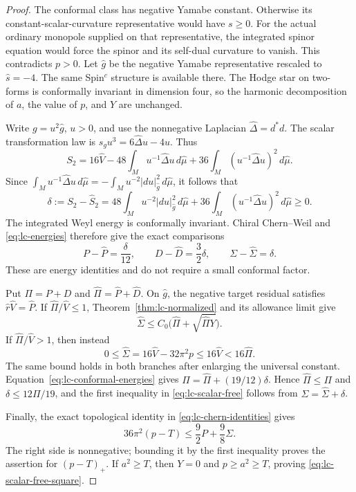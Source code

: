 \begin{proof}
The conformal class has negative Yamabe constant.  Otherwise its
constant-scalar-curvature representative would have $s\ge0$.  For
the actual ordinary monopole supplied on that representative, the
integrated spinor equation would force the spinor and its self-dual
curvature to vanish.  This contradicts $p>0$.  Let $\widehat g$
be the negative Yamabe representative rescaled to
$\widehat s=-4$.  The same Spin$^c$ structure is available there.
The Hodge star on two-forms is conformally invariant in dimension
four, so the harmonic decomposition of $a$, the value of $p$, and
$Y$ are unchanged.

Write $g=u^2\widehat g$, $u>0$, and use the nonnegative Laplacian
$\widehat\Delta=d^*d$.  The scalar transformation law is
$s_g u^3=6\widehat\Delta u-4u$.  Thus
\[
 S_2=16\widehat V-48\int_Mu^{-1}\widehat\Delta u\,d\widehat\mu
             +36\int_M(u^{-1}\widehat\Delta u)^2\,d\widehat\mu.
\]
Since
$\int_Mu^{-1}\widehat\Delta u\,d\widehat\mu
 =-\int_Mu^{-2}|du|_{\widehat g}^2\,d\widehat\mu$, it follows that
\begin{equation}\label{eq:lc-conformal-delta}
 \delta:=S_2-\widehat S_2
 =48\int_Mu^{-2}|du|_{\widehat g}^2\,d\widehat\mu
  +36\int_M(u^{-1}\widehat\Delta u)^2\,d\widehat\mu\ge0.
\end{equation}
The integrated Weyl energy is conformally invariant.  Chiral
Chern--Weil and \eqref{eq:lc-energies} therefore give the exact
comparisons
\begin{equation}\label{eq:lc-conformal-energies}
 P-\widehat P=\frac\delta{12},\qquad
 D-\widehat D=\frac32\delta,\qquad
 \Sigma-\widehat\Sigma=\delta.
\end{equation}
These are energy identities and do not require a small conformal factor.

Put $\Pi=P+D$ and $\widehat\Pi=\widehat P+\widehat D$.
On $\widehat g$, the negative target residual satisfies
$\widehat r\widehat V=\widehat P$.  If
$\widehat\Pi/\widehat V\le1$, Theorem~\ref{thm:lc-normalized}
and its allowance limit give
\[
 \widehat\Sigma\le C_0\bigl(\widehat\Pi+
                                      \sqrt{\widehat\Pi Y}\bigr).
\]
If $\widehat\Pi/\widehat V>1$, then instead
\[
 0\le\widehat\Sigma=16\widehat V-32\pi^2p
                  \le16\widehat V<16\widehat\Pi.
\]
The same bound holds in both branches after enlarging the universal
constant.  Equation~\eqref{eq:lc-conformal-energies}
gives
$\Pi=\widehat\Pi+(19/12)\delta$.  Hence
$\widehat\Pi\le\Pi$ and $\delta\le12\Pi/19$, and the first
inequality in \eqref{eq:lc-scalar-free} follows from
$\Sigma=\widehat\Sigma+\delta$.

Finally, the exact topological identity in
\eqref{eq:lc-chern-identities} gives
\[
 36\pi^2(p-T)\le\frac92P+\frac98\Sigma.
\]
The right side is nonnegative; bounding it by the first inequality
proves the assertion for $(p-T)_+$.  If $a^2\ge T$, then $Y=0$
and $p\ge a^2\ge T$, proving \eqref{eq:lc-scalar-free-square}.
\end{proof}

